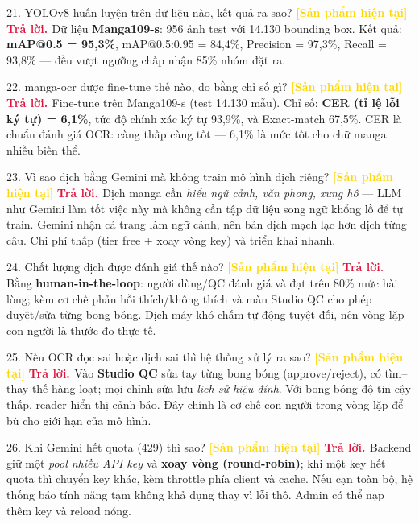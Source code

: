\documentclass[11pt]{article}
\newcommand{\tagSP}{\textcolor{gold}{\footnotesize\textbf{[Sản phẩm hiện tại]}}}
\newcommand{\A}{\textbf{\textcolor{crimson}{Trả lời. }}}
\begin{document}
\begin{qa}{21. YOLOv8 huấn luyện trên dữ liệu nào, kết quả ra sao? \tagSP}
\A Dữ liệu \textbf{Manga109-s}: 956 ảnh test với 14.130 bounding box. Kết quả: \textbf{mAP@0.5 = 95,3\%}, mAP@0.5:0.95 = 84,4\%, Precision = 97,3\%, Recall = 93,8\% --- đều vượt ngưỡng chấp nhận 85\% nhóm đặt ra.
\end{qa}

\begin{qa}{22. manga-ocr được fine-tune thế nào, đo bằng chỉ số gì? \tagSP}
\A Fine-tune trên Manga109-s (test 14.130 mẫu). Chỉ số: \textbf{CER (tỉ lệ lỗi ký tự) = 6,1\%}, tức độ chính xác ký tự \raisebox{0.2ex}{$\sim$}93,9\%, và Exact-match 67,5\%. CER là chuẩn đánh giá OCR: càng thấp càng tốt --- 6,1\% là mức tốt cho chữ manga nhiều biến thể.
\end{qa}

\begin{qa}{23. Vì sao dịch bằng Gemini mà không train mô hình dịch riêng? \tagSP}
\A Dịch manga cần \textit{hiểu ngữ cảnh, văn phong, xưng hô} --- LLM như Gemini làm tốt việc này mà không cần tập dữ liệu song ngữ khổng lồ để tự train. Gemini nhận cả trang làm ngữ cảnh, nên bản dịch mạch lạc hơn dịch từng câu. Chi phí thấp (tier free + xoay vòng key) và triển khai nhanh.
\end{qa}

\begin{qa}{24. Chất lượng dịch được đánh giá thế nào? \tagSP}
\A Bằng \textbf{human-in-the-loop}: người dùng/QC đánh giá và đạt trên 80\% mức hài lòng; kèm cơ chế phản hồi thích/không thích và màn Studio QC cho phép duyệt/sửa từng bong bóng. Dịch máy khó chấm tự động tuyệt đối, nên vòng lặp con người là thước đo thực tế.
\end{qa}

\begin{qa}{25. Nếu OCR đọc sai hoặc dịch sai thì hệ thống xử lý ra sao? \tagSP}
\A Vào \textbf{Studio QC} sửa tay từng bong bóng (approve/reject), có tìm--thay thế hàng loạt; mọi chỉnh sửa lưu \textit{lịch sử hiệu đính}. Với bong bóng độ tin cậy thấp, reader hiển thị cảnh báo. Đây chính là cơ chế con-người-trong-vòng-lặp để bù cho giới hạn của mô hình.
\end{qa}

\begin{qa}{26. Khi Gemini hết quota (429) thì sao? \tagSP}
\A Backend giữ một \textit{pool nhiều API key} và \textbf{xoay vòng (round-robin)}; khi một key hết quota thì chuyển key khác, kèm throttle phía client và cache. Nếu cạn toàn bộ, hệ thống báo tính năng tạm không khả dụng thay vì lỗi thô. Admin có thể nạp thêm key và reload nóng.
\end{qa}
\end{document}
